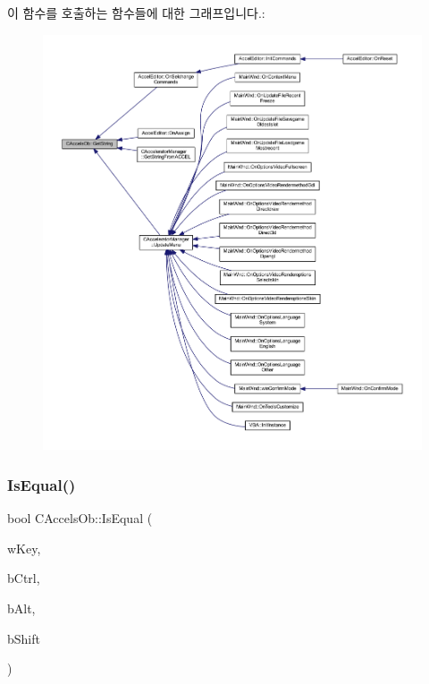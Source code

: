 이 함수를 호출하는 함수들에 대한 그래프입니다.\+:
\nopagebreak
\begin{figure}[H]
\begin{center}
\leavevmode
\includegraphics[width=350pt]{class_c_accels_ob_afaf7510fa1e0707863f6bd469f190de6_icgraph}
\end{center}
\end{figure}
\mbox{\label{class_c_accels_ob_a32714a4454d398d3d3a68d1705a76bc5}} 
\subsubsection{\texorpdfstring{Is\+Equal()}{IsEqual()}}
{\footnotesize\ttfamily bool C\+Accels\+Ob\+::\+Is\+Equal (\begin{DoxyParamCaption}\item[{W\+O\+RD}]{w\+Key,  }\item[{bool}]{b\+Ctrl,  }\item[{bool}]{b\+Alt,  }\item[{bool}]{b\+Shift }\end{DoxyParamCaption})}



